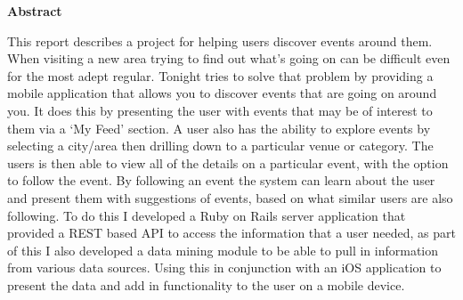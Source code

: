 \thispagestyle{empty}

\begin{center}
    {\LARGE\bf Abstract}
\end{center}

This report describes a project for helping users discover events around them. When visiting  a new area trying to find out what's going on can be difficult even for the most adept regular. Tonight tries to solve that problem by providing a mobile application that allows you to discover events that are going on around you. It does this by presenting the user with events that may be of interest to them via a `My Feed' section. A user also has the ability to explore events by selecting a city/area then drilling down to a particular venue or category. The users is then able to view all of the details on a particular event, with the option to follow the event. By following an event the system can learn about the user and present them with suggestions of events, based on what similar users are also following. To do this I developed a Ruby on Rails server application that provided a REST based API to access the information that a user needed, as part of this I also developed a data mining module to be able to pull in information from various data sources. Using this in conjunction with an iOS application to present the data and add in functionality to the user on a mobile device. 